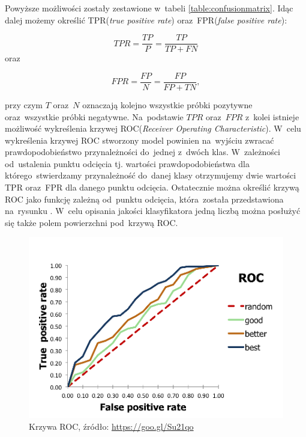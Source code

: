 \noindent
Powyższe możliwości zostały zestawione w~tabeli \ref{table:confusionmatrix}. Idąc dalej możemy określić TPR(\textit{true positive rate}) oraz~FPR(\textit{false positive rate}):


\begin{equation}
TPR = \frac{TP}{P} = \frac{TP}{TP+FN} 
\end{equation}
\noindent
oraz

\begin{equation}
FPR = \frac{FP}{N} = \frac{FP}{FP+TN},
\end{equation}

przy czym $T$ oraz~$N$ oznaczają kolejno wszystkie próbki pozytywne oraz~wszystkie próbki negatywne. Na~podstawie $TPR$ oraz~$FPR$ z~kolei istnieje możliwość wykreślenia krzywej ROC(\textit{Receiver Operating Characteristic}). W~celu wykreślenia krzywej ROC stworzony model powinien na~wyjściu zwracać prawdopodobieństwo  przynależności do~jednej z~dwóch klas. W~zależności od~ustalenia punktu odcięcia tj. wartości prawdopodobieństwa dla którego~stwierdzamy przynależność do~danej klasy otrzymujemy dwie wartości TPR oraz~FPR dla danego punktu odcięcia. Ostatecznie można określić krzywą ROC jako funkcję zależną od~punktu odcięcia, która~została przedstawiona na~rysunku \label{roc}. W~celu opisania jakości klasyfikatora jedną liczbą można posłużyć się także polem powierzchni pod~krzywą ROC.

\begin{figure}[ht!]
\centering
\includegraphics[scale=0.7]{res/roc3.png}
\caption[Caption for LOF]{Krzywa ROC, źródło: \url{https://goo.gl/Su21qo}\label{roc}} 
\end{figure}



